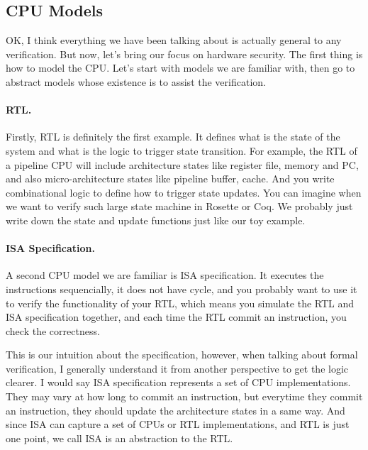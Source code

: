 \documentclass{article}
\begin{document}
\subsection{CPU Models}

OK, I think everything we have been talking about is actually general to any verification.
But now, let's bring our focus on hardware security.
The first thing is how to model the CPU.
Let's start with models we are familiar with, then go to abstract models whose existence is to assist the verification.




\paragraph{RTL.}
Firstly, RTL is definitely the first example.
It defines what is the state of the system and what is the logic to trigger state transition.
For example, the RTL of a pipeline CPU will include architecture states like register file, memory and PC, and also micro-architecture states like pipeline buffer, cache.
And you write combinational logic to define how to trigger state updates.
You can imagine when we want to verify such large state machine in Rosette or Coq.
We probably just write down the state and update functions just like our toy example.




\paragraph{ISA Specification.}
A second CPU model we are familiar is ISA specification.
It executes the instructions sequencially, it does not have cycle, and you probably want to use it to verify the functionality of your RTL, which means you simulate the RTL and ISA specification together, and each time the RTL commit an instruction, you check the correctness.

This is our intuition about the specification, however, when talking about formal verification, I generally understand it from another perspective to get the logic clearer.
I would say ISA specification represents a set of CPU implementations.
They may vary at how long to commit an instruction, but everytime they commit an instruction, they should update the architecture states in a same way.
And since ISA can capture a set of CPUs or RTL implementations, and RTL is just one point, we call ISA is an abstraction to the RTL.
\end{document}
